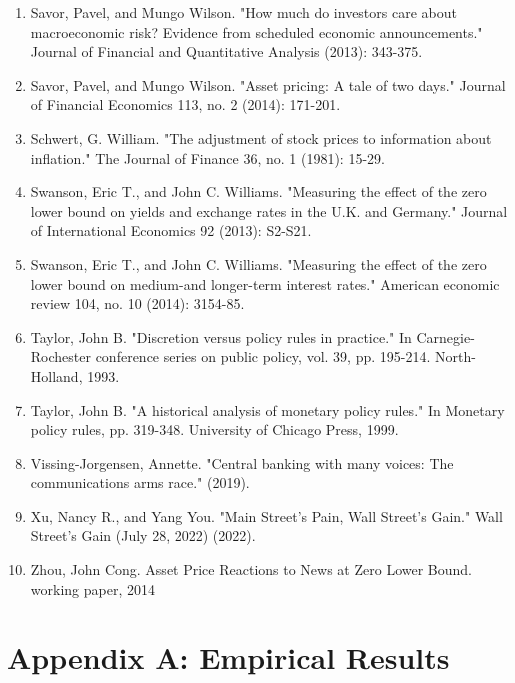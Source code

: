 \documentclass[12pt]{article}
\begin{document}
\begin{enumerate}
    \item{Savor, Pavel, and Mungo Wilson. "How much do investors care about macroeconomic risk? Evidence from scheduled economic announcements." Journal of Financial and Quantitative Analysis (2013): 343-375.}
    \item{Savor, Pavel, and Mungo Wilson. "Asset pricing: A tale of two days." Journal of Financial Economics 113, no. 2 (2014): 171-201.}
    \item{Schwert, G. William. "The adjustment of stock prices to information about inflation." The Journal of Finance 36, no. 1 (1981): 15-29.}
    \item{Swanson, Eric T., and John C. Williams. "Measuring the effect of the zero lower bound on yields and exchange rates in the U.K. and Germany." Journal of International Economics 92 (2013):  S2-S21.}
    \item{Swanson, Eric T., and John C. Williams. "Measuring the effect of the zero lower bound on medium-and longer-term interest rates." American economic review 104, no. 10 (2014): 3154-85.}
    \item{Taylor, John B. "Discretion versus policy rules in practice." In Carnegie-Rochester conference series on public policy, vol. 39, pp. 195-214. North-Holland, 1993.}
    \item{Taylor, John B. "A historical analysis of monetary policy rules." In Monetary policy rules, pp. 319-348. University of Chicago Press, 1999.}
    \item{Vissing-Jorgensen, Annette. "Central banking with many voices: The communications arms race." (2019).}
    \item{Xu, Nancy R., and Yang You. "Main Street's Pain, Wall Street's Gain." Wall Street's Gain (July 28, 2022) (2022).}
    \item{Zhou, John Cong. Asset Price Reactions to News at Zero Lower Bound. working paper, 2014}
\end{enumerate}
    
\pagebreak

\section{Appendix A: Empirical Results} \label{sec:Model}
\end{document}
